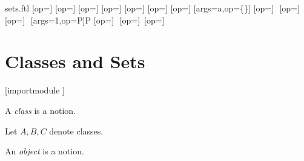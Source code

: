\documentclass{article}
\begin{document}
\begin{smodule}{sets.ftl}
\STEXexport{
  \let\oldsubseteq\subseteq
  \let\subseteq\relax
  \let\oldsubset\subset
  \let\subset\relax
  \let\oldsupseteq\supseteq
  \let\supseteq\relax
  \let\oldsupset\supset
  \let\supset\relax
  \let\oldsubsetneq\subsetneq
  \let\subsetneq\relax
  \let\oldsupsetneq\supsetneq
  \let\supsetneq\relax
  \let\oldemptyset\emptyset
  \let\emptyset\relax
  \let\oldcup\cup
  \let\cup\relax
  \let\oldcap\cap
  \let\cap\relax
  \let\oldsetminus\setminus
  \let\setminus\relax
  \let\oldtimes\times
  \let\times\relax
  \let\oldbigcup\bigcup
  \let\bigcup\relax
  \let\oldbigcap\bigcap
  \let\bigcap\relax
}
[op=\oldsubseteq]{\;\oldsubseteq\;}
[op=\oldsubset]{\;\oldsubset\;}
[op=\oldsupseteq]{\;\oldsupseteq\;}
[op=\oldsupset]{\;\oldsupset\;}
[op=\oldsubsetneq]{\;\oldsubsetneq\;}
[op=\oldsupsetneq]{\;\oldsupsetneq\;}
[op=\oldemptyset]{\oldemptyset}
[args=a,op=\{\cdot\}]{\comp{\{}\comp{\}}}
[op=\oldcup]{\,\oldcup\,}
[op=\oldcap]{\,\oldcap\,}
[op=\oldsetminus]{\,\oldsetminus\,}
[args=1,op=\mathcal P]{\mathcal P}
[op=\oldtimes]{\,\oldtimes\,}
[op=\oldbigcup]{\oldbigcup\,}
[op=\oldbigcap]{\oldbigcap\,}

\section{Classes and Sets}

\begin{forthel}

  [importmodule ]
\end{forthel}

\begin{signature*}
  A \emph{class} is a notion.
\end{signature*}

\begin{forthel}
  Let $A,B,C$ denote classes.
\end{forthel}

\begin{signature*}
  An \emph{object} is a notion.
\end{signature*}


\end{smodule}
\end{document}
